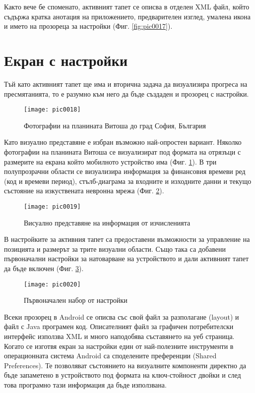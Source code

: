 Както вече бе споменато, активният тапет се описва в отделен XML файл, който съдържа кратка анотация на приложението, предварителен изглед, умалена икона и името на прозореца за настройки (Фиг. \ref{fig:pic0017}). 

\section{Екран с настройки}

Тъй като активният тапет ще има и вторична задача да визуализира прогреса на пресмятанията, то е разумно към него да бъде създаден и прозорец с настройки. 

\begin{figure}[h]
  \centering
  \texttt{[image: pic0018]}
  \caption{Фотографии на планината Витоша до град София, България}
\label{fig:pic0018}
\end{figure}
\FloatBarrier

Като визуално представяне е избран възможно най-опростен вариант. Няколко фотографии на планината Витоша се визуализират под формата на отрязъци с размерите на екрана който мобилното устройство има (Фиг. \ref{fig:pic0018}). В три полупрозрачни области се визуализира информация за финансовия времеви ред (код и времеви период), стълб-диаграма за входните и изходните данни и текущо състояние на изкуствената невронна мрежа (Фиг. \ref{fig:pic0019}). 

\begin{figure}[h]
  \centering
  \texttt{[image: pic0019]}
  \caption{Висуално представяне на информация от изчисленията}
\label{fig:pic0019}
\end{figure}
\FloatBarrier

В настройките за активния тапет са предоставени възможности за управление на позицията и размерът за трите визуални области. Също така са добавени първоначални настройки за натоварване на устройството и дали активният тапет да бъде включен (Фиг. \ref{fig:pic0020}). 

\begin{figure}[h]
  \centering
  \texttt{[image: pic0020]}
  \caption{Първоначален набор от настройки}
\label{fig:pic0020}
\end{figure}
\FloatBarrier

Всеки прозорец в Android се описва със свой файл за разполагане (layout) и файл с Java програмен код. Описателният файл за графичен потребителски интерфейс използва XML и много наподобява съставянето на уеб страница. Когато се изготвя екран за настройки един от най-полезните инструменти в операционната система Android са споделените преференции (Shared Preferences). Те позволяват състоянието на визуалните компоненти директно да бъде запаметено в устройството под формата на ключ-стойност двойки и след това програмно тази информация да бъде използвана. 

